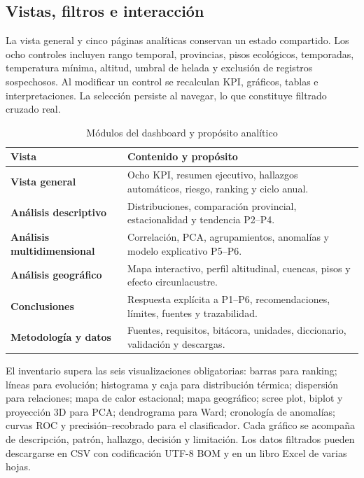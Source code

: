 \documentclass[11pt,a4paper]{article}
\begin{document}
\subsection{Vistas, filtros e interacción}

La vista general y cinco páginas analíticas conservan un estado compartido. Los ocho
controles incluyen rango temporal, provincias, pisos ecológicos, temporadas, temperatura
mínima, altitud, umbral de helada y exclusión de registros sospechosos. Al modificar un
control se recalculan KPI, gráficos, tablas e interpretaciones. La selección persiste al
navegar, lo que constituye filtrado cruzado real.

\begin{table}[H]
\centering
\caption{Módulos del dashboard y propósito analítico}
\label{tab:modulos}
\small
\begin{tabularx}{\textwidth}{>{\bfseries}p{3.4cm}X}
\toprule
Vista & Contenido y propósito \\
\midrule
Vista general & Ocho KPI, resumen ejecutivo, hallazgos automáticos, riesgo, ranking y ciclo anual. \\
Análisis descriptivo & Distribuciones, comparación provincial, estacionalidad y tendencia P2--P4. \\
Análisis multidimensional & Correlación, PCA, agrupamientos, anomalías y modelo explicativo P5--P6. \\
Análisis geográfico & Mapa interactivo, perfil altitudinal, cuencas, pisos y efecto circunlacustre. \\
Conclusiones & Respuesta explícita a P1--P6, recomendaciones, límites, fuentes y trazabilidad. \\
Metodología y datos & Fuentes, requisitos, bitácora, unidades, diccionario, validación y descargas. \\
\bottomrule
\end{tabularx}
\end{table}

El inventario supera las seis visualizaciones obligatorias: barras para ranking; líneas
para evolución; histograma y caja para distribución térmica; dispersión para relaciones;
mapa de calor estacional; mapa geográfico; scree plot, biplot y proyección 3D para PCA;
dendrograma para Ward; cronología de anomalías; curvas ROC y precisión--recobrado para el
clasificador. Cada gráfico se acompaña de descripción, patrón, hallazgo, decisión y
limitación. Los datos filtrados pueden descargarse en CSV con codificación UTF-8 BOM y en
un libro Excel de varias hojas.
\end{document}
